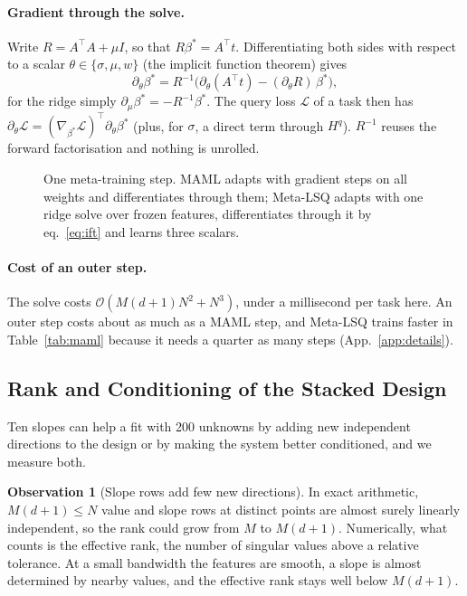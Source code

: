\documentclass[fullpaper,final]{nldl}
\theoremstyle{plain}
\theoremstyle{definition}
\newtheorem{observation}{Observation}
\begin{document}
\paragraph{Gradient through the solve.}
Write $R = A^\top\! A + \mu I$, so that $R\beta^\ast = A^\top t$. Differentiating
both sides with respect to a scalar $\theta \in \{\sigma, \mu, w\}$ (the implicit
function theorem) gives
\begin{equation}
\label{eq:ift}
\partial_\theta \beta^\ast = R^{-1}\big(\partial_\theta (A^\top t) - (\partial_\theta R)\,\beta^\ast\big),
\end{equation}
for the ridge simply $\partial_\mu \beta^\ast = -R^{-1}\beta^\ast$. The query loss
$\mathcal{L}$ of a task then has $\partial_\theta \mathcal{L} = (\nabla_{\beta^\ast}
\mathcal{L})^\top \partial_\theta \beta^\ast$ (plus, for $\sigma$, a direct term
through $H^q$). $R^{-1}$ reuses the forward factorisation and nothing is unrolled.

\begin{figure}[tb]
\centering

\caption{One meta-training step. MAML adapts with gradient steps on all weights and
differentiates through them; Meta-LSQ adapts with one ridge solve over frozen
features, differentiates through it by eq.~\eqref{eq:ift} and learns three scalars.}
\label{fig:workflow}
\end{figure}

\paragraph{Cost of an outer step.}
The solve costs $\mathcal{O}(M(d{+}1)N^2 + N^3)$, under a millisecond per task here.
An outer step costs about as much as a MAML step, and Meta-LSQ trains faster in
Table~\ref{tab:maml} because it needs a quarter as many steps (App.~\ref{app:details}).

\subsection{Rank and Conditioning of the Stacked Design}
\label{sec:mechanism}

Ten slopes can help a fit with 200 unknowns by adding new independent directions to
the design or by making the system better conditioned, and we measure both.

\begin{observation}[Slope rows add few new directions]
\label{obs:rank}
In exact arithmetic, $M(d{+}1) \leq N$ value and slope rows at distinct points are
almost surely linearly independent, so the rank could grow from $M$ to $M(d{+}1)$.
Numerically, what counts is the effective rank, the number of singular values above
a relative tolerance. At a small bandwidth the features are smooth, a slope is
almost determined by nearby values, and the effective rank stays well below
$M(d{+}1)$.
\end{observation}
\end{document}
